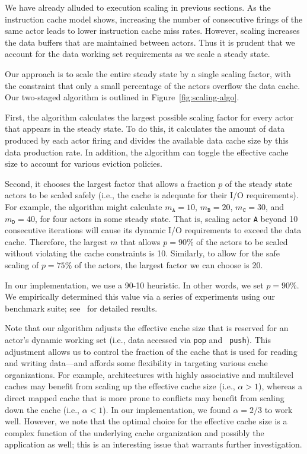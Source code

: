 We have already alluded to execution scaling in previous
sections. As the instruction cache model shows, increasing the number
of consecutive firings of the same actor leads to lower instruction
cache miss rates. However, scaling increases the data buffers that are
maintained between actors. Thus it is prudent that we account for the
data working set requirements as we scale a steady state.

Our approach is to scale the entire steady state by a single
scaling factor, with the constraint that only a small percentage
of the actors overflow the data cache. Our two-staged algorithm is
outlined in Figure~\ref{fig:scaling-algo}.

First, the algorithm calculates the largest possible scaling factor
for every actor that appears in the steady state. To do this, it calculates the
amount of data produced by each actor firing and divides the available
data cache size by this data production rate. In addition, the
algorithm can toggle the effective cache size to account for various
eviction policies.

Second, it chooses the largest
factor that allows a fraction $p$ of the steady state actors to be
scaled safely (i.e., the cache is adequate for their I/O
requirements).  For example, the algorithm might calculate
$m_\texttt{A} = 10$,
$m_\texttt{B} = 20$, 
$m_\texttt{C} = 30$, and 
$m_\texttt{D} = 40$, for four actors in some steady state. That is,
scaling actor \texttt{A} beyond 10 consecutive iterations will cause
its dynamic I/O requirements to exceed the data cache. Therefore, the
largest $m$ that allows $p=90\%$ of the actors to be
scaled without violating the cache constraints is 10.
Similarly, to allow for the safe scaling of $p=75\%$ of the actors, the
largest factor we can choose is 20.

In our implementation, we use a 90-10 heuristic. In other words, we
set $p=90\%$. We empirically determined this value via a series of
experiments using our benchmark suite; see~\cite{janis-thesis} for
detailed results.

Note that our algorithm adjusts the effective cache size that is
reserved for an actor's 
dynamic working set (i.e., data accessed via {\tt pop} and {\tt
push}). This adjustment allows us to control the fraction of the cache
that is used for reading and writing data---and affords some
flexibility in targeting various cache organizations.  For example,
architectures with highly associative and multilevel caches may benefit
from scaling up the effective cache size (i.e., $\alpha > 1$), whereas
a direct mapped cache that is more prone to conflicts may benefit from
scaling down the cache (i.e., $\alpha < 1$). In our implementation, we
found $\alpha=2/3$ to work well. However, we note that the optimal
choice for the effective cache size is a complex function of the 
underlying cache organization and possibly the application as well; 
this is an interesting issue that warrants further investigation.

